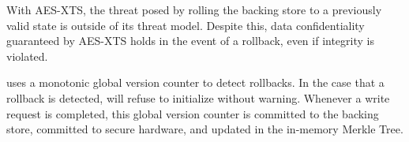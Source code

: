 With AES-XTS, the threat posed by rolling the backing store to a
previously valid state is outside of its threat model. Despite this,
data confidentiality guaranteed by AES-XTS holds in the event of a
rollback, even if integrity is violated.

\SYSTEM{} uses a monotonic global version counter to detect rollbacks.
In the case that a rollback is detected, \SYSTEM{} will refuse to
initialize without warning. Whenever a write request is completed,
this global version counter is committed to the backing store,
committed to secure hardware, and updated in the in-memory Merkle
Tree.

